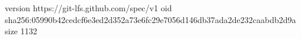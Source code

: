 version https://git-lfs.github.com/spec/v1
oid sha256:05990b42cedcf6e3ed2d352a73e6fc29e7056d146db37ada2de232caabdb2d9a
size 1132
